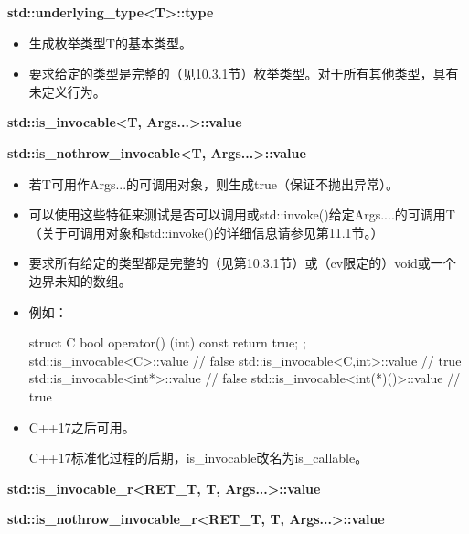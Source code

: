 \textbf{std::underlying\_type<T>::type}

\begin{itemize}
\item 
生成枚举类型T的基本类型。

\item 
要求给定的类型是完整的（见10.3.1节）枚举类型。对于所有其他类型，具有未定义行为。
\end{itemize}

\textbf{std::is\_invocable<T, Args...>::value}

\textbf{std::is\_nothrow\_invocable<T, Args...>::value}

\begin{itemize}
\item 
若T可用作Args...的可调用对象，则生成true（保证不抛出异常）。

\item 
可以使用这些特征来测试是否可以调用或std::invoke()给定Args....的可调用T（关于可调用对象和std::invoke()的详细信息请参见第11.1节。）

\item 
要求所有给定的类型都是完整的（见第10.3.1节）或（cv限定的）void或一个边界未知的数组。

\item 
例如：
\begin{cpp}
struct C {
	bool operator() (int) const {
		return true;
	}
};
std::is_invocable<C>::value // false
std::is_invocable<C,int>::value // true
std::is_invocable<int*>::value // false
std::is_invocable<int(*)()>::value // true
\end{cpp}

\item 
C++17之后可用。

\begin{notice}
C++17标准化过程的后期，is\_invocable改名为is\_callable。
\end{notice}
\end{itemize}

\textbf{std::is\_invocable\_r<RET\_T, T, Args...>::value}

\textbf{std::is\_nothrow\_invocable\_r<RET\_T, T, Args...>::value}

